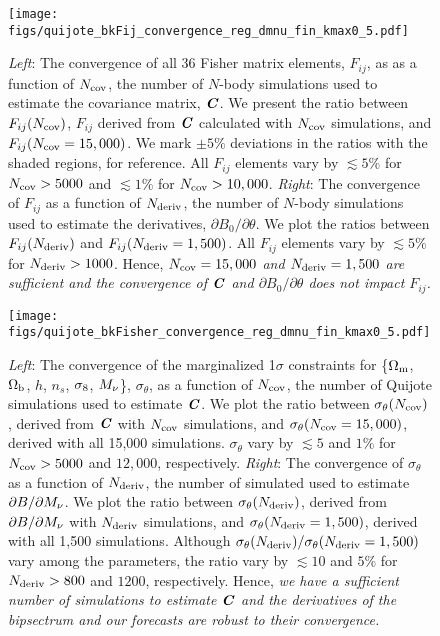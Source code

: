 \begin{figure}
\begin{center}
    \texttt{[image: figs/quijote\_bkFij\_convergence\_reg\_dmnu\_fin\_kmax0\_5.pdf]}
    \caption{
        {\em Left}: The convergence of all 36 Fisher matrix elements, $F_{ij}$, as 
        as a function of $N_{\rm cov}$, the number of $N$-body simulations used to 
        estimate the covariance matrix, $\textbf{\textit{C}}$. We present the ratio between 
        $F_{ij}(N_{\rm cov})$, $F_{ij}$ derived from $\textbf{\textit{C}}$ calculated with 
        $N_{\rm cov}$ simulations, and $F_{ij}(N_{\rm cov} = 15,000)$. We mark 
        $\pm5\%$ deviations in the ratios with the shaded regions, for reference. 
        All $F_{ij}$ elements vary by $\lesssim 5\%$ for $N_{\rm cov} > 5000$ and 
        $\lesssim 1\%$ for $N_{\rm cov} > 10,000$.
        {\em Right}: The convergence of $F_{ij}$ as a function of $N_{\rm deriv}$, 
        the number of $N$-body simulations used to estimate the derivatives, 
        $\partial B_0/\partial \theta$. We plot the ratios between $F_{ij}(N_{\rm deriv})$ 
        and $F_{ij}(N_{\rm deriv} = 1,500)$. All $F_{ij}$ elements vary by 
        $\lesssim 5\%$ for $N_{\rm deriv} > 1000$. Hence, {\em $N_{\rm cov} = 15,000$ 
        and $N_{\rm deriv} = 1,500$ are sufficient and the convergence of $\textbf{\textit{C}}$ 
        and $\partial B_0/\partial \theta$ does not impact $F_{ij}$.}
    }
\label{fig:fij_converge}
\end{center}
\end{figure}

\begin{figure}
\begin{center}
    \texttt{[image: figs/quijote\_bkFisher\_convergence\_reg\_dmnu\_fin\_kmax0\_5.pdf]} 
    \caption{{\em Left}: The convergence of the marginalized 1$\sigma$ constraints
    for \{$\Omega_{\rm m}$, $\Omega_{\rm b}$, $h$, $n_s$, $\sigma_8$, $M_\nu$\}, $\sigma_\theta$, as a function of 
    $N_{\rm cov}$, the number of Quijote simulations used to estimate $\textbf{\textit{C}}$. We 
    plot the ratio between $\sigma_\theta(N_{\rm cov})$, derived from $\textbf{\textit{C}}$ with 
    $N_{\rm cov}$ simulations, and $\sigma_\theta(N_{\rm cov} = 15,000)$, derived 
    with all 15,000 simulations. $\sigma_\theta$ vary by $\lesssim 5$ and $1\%$ for 
    $N_{\rm cov} > 5000$ and $12,000$, respectively. 
    {\em Right}: The convergence of $\sigma_\theta$ as a function of $N_{\rm deriv}$, 
    the number of simulated used to estimate $\partial B/\partial M_\nu$. We plot 
    the ratio between $\sigma_\theta(N_{\rm deriv})$, derived from $\partial B/\partial M_\nu$
    with $N_{\rm deriv}$ simulations, and $\sigma_\theta(N_{\rm deriv} = 1,500)$, 
    derived with all 1,500 simulations. Although 
    $\sigma_\theta(N_{\rm deriv})/\sigma_\theta(N_{\rm deriv} = 1,500)$ vary among 
    the parameters, the ratio vary by $\lesssim 10$ and $5\%$ for $N_{\rm deriv} > 800$ 
    and $1200$, respectively. Hence, {\em we have a sufficient number of simulations 
    to estimate $\textbf{\textit{C}}$ and the derivatives of the bipsectrum and our forecasts are 
    robust to their convergence.} 
    }
\label{fig:converge}
\end{center}
\end{figure}

